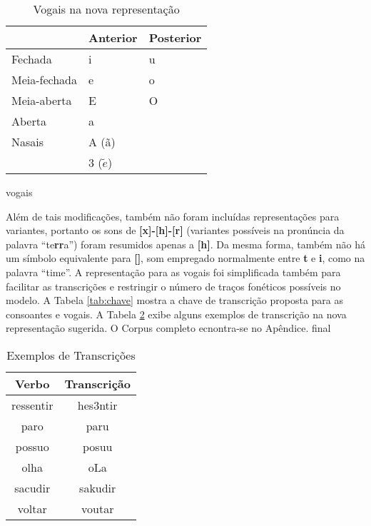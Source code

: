 \begin{center}
\begin{table}[H]
\begin{center}
    \begin{tabular}{lll}
        \hline
         & Anterior & Posterior \\
         \hline
        Fechada & i & u \\
        \hline
        Meia-fechada & e & o \\
        \hline
        Meia-aberta & E & O \\
        \hline
        Aberta & a &  \\
        \hline
        Nasais & A (ã) &\\ & 3 ($\tilde{e}$) &\\ 
        \hline
    \end{tabular}
\end{center}
\caption{Vogais na nova representação}
\label{tab:new_vocals}
\end{table}
\end{center}

vogais 

Além de tais modificações, também não foram incluídas representações para variantes, portanto os sons de \textbf{[x]-[h]-[r]} (variantes possíveis na pronúncia da palavra “te\textbf{rr}a”) foram resumidos apenas a \textbf{[h]}. Da mesma forma, também não há um símbolo equivalente para \textbf{[]}, som empregado normalmente entre \textbf{t} e \textbf{i}, como na palavra “time”. A representação para as vogais foi simplificada também para facilitar as transcrições e restringir o número de traços fonéticos possíveis no modelo. A Tabela \ref{tab:chave} mostra a chave de transcrição proposta para as consoantes e vogais. A Tabela \ref{tab:transc} exibe alguns exemplos de transcrição na nova representação sugerida. O Corpus completo ecnontra-se no Apêndice.
final
\begin{table}[H]
\begin{center}
\begin{tabular}{cc}
\hline
\textbf{Verbo} & \textbf{Transcrição} \\ \hline
ressentir & hes3ntir \\
paro & paru \\
possuo & posuu \\
olha & oLa \\
sacudir & sakudir \\
voltar & voutar \\ \hline
\end{tabular}
\end{center}
\caption{Exemplos de Transcrições}
\label{tab:transc}
\end{table}

